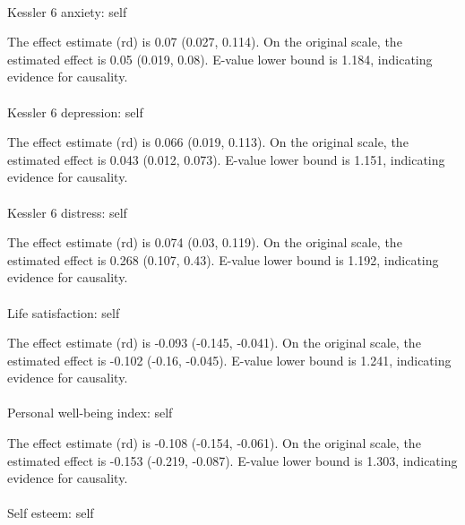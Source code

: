 \documentclass[
  single column]{article}
\makeatletter
\let\oldparagraph\paragraph
\renewcommand{\paragraph}{
    \@ifstar
      \xxxParagraphStar
      \xxxParagraphNoStar
  }
\newcommand{\xxxParagraphStar}[1]{\oldparagraph*{#1}\mbox{}}
\newcommand{\xxxParagraphNoStar}[1]{\oldparagraph{#1}\mbox{}}
\makeatother
\begin{document}
\paragraph{Kessler 6 anxiety: self}\label{kessler-6-anxiety-self-2}

The effect estimate (rd) is 0.07 (0.027, 0.114). On the original scale,
the estimated effect is 0.05 (0.019, 0.08). E-value lower bound is
1.184, indicating evidence for causality.

\paragraph{Kessler 6 depression:
self}\label{kessler-6-depression-self-1}

The effect estimate (rd) is 0.066 (0.019, 0.113). On the original scale,
the estimated effect is 0.043 (0.012, 0.073). E-value lower bound is
1.151, indicating evidence for causality.

\paragraph{Kessler 6 distress: self}\label{kessler-6-distress-self-1}

The effect estimate (rd) is 0.074 (0.03, 0.119). On the original scale,
the estimated effect is 0.268 (0.107, 0.43). E-value lower bound is
1.192, indicating evidence for causality.

\paragraph{Life satisfaction: self}\label{life-satisfaction-self-3}

The effect estimate (rd) is -0.093 (-0.145, -0.041). On the original
scale, the estimated effect is -0.102 (-0.16, -0.045). E-value lower
bound is 1.241, indicating evidence for causality.

\paragraph{Personal well-being index:
self}\label{personal-well-being-index-self-2}

The effect estimate (rd) is -0.108 (-0.154, -0.061). On the original
scale, the estimated effect is -0.153 (-0.219, -0.087). E-value lower
bound is 1.303, indicating evidence for causality.

\paragraph{Self esteem: self}\label{self-esteem-self-3}
\end{document}
